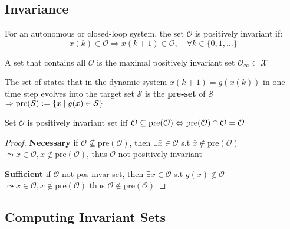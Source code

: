 
\subsection{Invariance}

\begin{definition}
	For an autonomous or closed-loop system,
	the set $\mathcal{O}$ is positively invariant if:
	\[
		x(k)\in\mathcal{O}\Rightarrow
		x(k+1) \in \mathcal{O},
		\quad \forall k \in \{0,1,\dots\}
	\]
\end{definition}

\begin{definition}
	A set that contains all $\mathcal{O}$
	is the maximal positively invariant set
	$\mathcal{O}_\infty \subset \mathcal{X}$
\end{definition}

\begin{definition}
	The set of states that
	in the dynamic system $x(k+1) = g(x(k))$
	in one time step evolves into the target set $\mathcal{S}$
	is the \textbf{pre-set} of $\mathcal{S}$
	$\Rightarrow \operatorname{pre}(\mathcal{S}) := \{x\mid g(x)\in \mathcal{S}\}$
\end{definition}

\begin{theorem}
	Set $\mathcal{O}$ is positively invariant set iff
	$\mathcal{O}\subseteq\operatorname{pre}(\mathcal{O})
		\Leftrightarrow
		\operatorname{pre}(\mathcal{O})\cap\mathcal{O} = \mathcal{O}$
\end{theorem}
\begin{proof}
	\textbf{Necessary} if
	$\mathcal{O} \nsubseteq  \mathrm{pre}(\mathcal{O})$,
	then $\exists\bar{x} \in \mathcal{O}$
	s.t $\bar{x} \notin \mathrm{pre}(\mathcal{O})$
	$\leadsto \bar{x}\in\mathcal{O},
		\bar{x}\notin\mathrm{pre}(\mathcal{O})$,
	thus $\mathcal{O}$ not positively invariant

	\textbf{Sufficient} if
	$\mathcal{O}$ not pos invar set,
	then $\exists \bar{x}\in\mathcal{O}$
	s.t $g(\bar{x}) \notin\mathcal{O}$
	$\leadsto \bar{x}\in\mathcal{O},
		\bar{x}\notin\mathrm{pre}(\mathcal{O})$
	thus $\mathcal{O}\notin \mathrm{pre}(\mathcal{O})$
\end{proof}


\subsection{Computing Invariant Sets}


